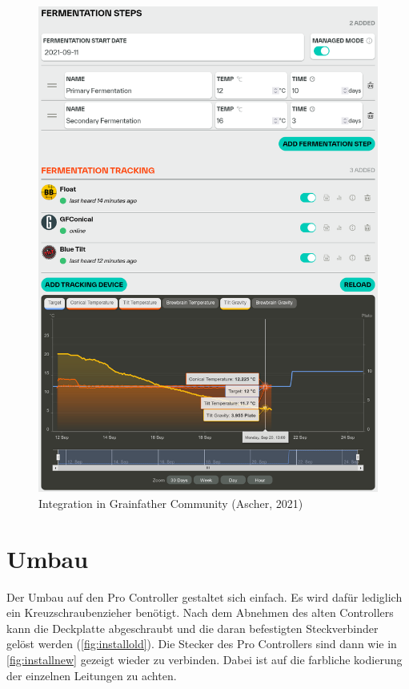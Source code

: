\documentclass[a4paper,parskip=half]{scrartcl}
\begin{document}
\begin{figure}[H]
\centering
\includegraphics[width=14.4cm]{images/gfpc_integration.png}
\caption{Integration in Grainfather Community (Ascher, 2021)}
\label{fig:integration}
\end{figure}

\section*{Umbau}

Der Umbau auf den Pro Controller gestaltet sich einfach. Es
wird dafür lediglich ein Kreuzschraubenzieher benötigt.
Nach dem Abnehmen des alten Controllers kann die Deckplatte
abgeschraubt und die daran befestigten Steckverbinder
gelöst werden (\autoref{fig:installold}). Die Stecker des
Pro Controllers sind dann wie in \autoref{fig:installnew}
gezeigt wieder zu verbinden. Dabei ist auf die farbliche
kodierung der einzelnen Leitungen zu achten.
\end{document}
